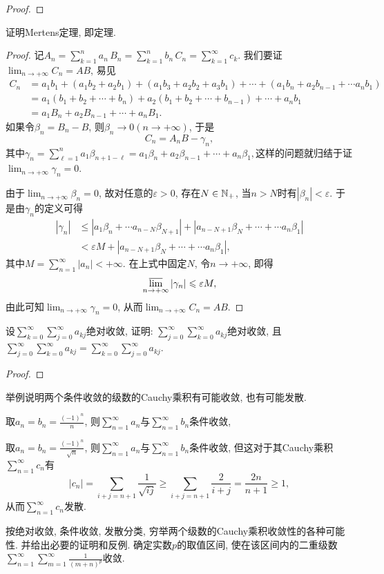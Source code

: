 \begin{quiza}
\begin{proof}
\end{proof}
\woe 证明Mertens定理, 即定理.
\begin{proof}
记\(A_n=\sum_{k=1}^{n}a_n\,B_n=\sum_{k=1}^{n}b_n\,C_n=\sum_{k=1}^{\infty}c_k\). 我们要证\(\lim_{n\rightarrow+\infty}C_n=AB\), 易见\[\begin{split}
C_n&=a_1b_1+(a_1b_2+a_2b_1)+(a_1b_3+a_2b_2+a_3b_1)+\cdots+\left(a_1b_n+a_2b_{n-1}+\cdots a_nb_1\right)\\&=a_1\left(b_1+b_2+\cdots+b_n\right)+a_2(b_1+b_2+\cdots+b_{n-1})+\cdots+a_nb_1\\&=a_1B_n+a_2B_{n-1}+\cdots+a_nB_1.
\end{split}\]如果令\(\beta_n=B_n-B\), 则\(\beta_n\rightarrow 0(n\rightarrow+\infty)\), 于是\[C_n=A_nB-\gamma_n,\]其中\(\gamma_n=\sum_{\ell=1}^{n}a_1\beta_{n+1-\ell}=a_1\beta_n+a_2\beta_{n-1}+\cdots+a_n\beta_1,\)这样的问题就归结于证\(\lim_{n\rightarrow+\infty}\gamma_n=0\).

由于\(\lim_{n\rightarrow+\infty}\beta_n=0\), 故对任意的\(\varepsilon>0\), 存在\(N\in\mathbb{N}_+\), 当\(n>N\)时有\(|\beta_n|<\varepsilon\). 于是由\(\gamma_n\)的定义可得\[\begin{split}
|\gamma_n|&\leqslant\left|a_1\beta_n+\cdots a_{n-N}\beta_{N+1}\right|+\left|a_{n-N+1}\beta_{N}+\cdots+\cdots a_n\beta_1\right|\\&<\varepsilon M+\left|a_{n-N+1}\beta_{N}+\cdots+\cdots a_n\beta_1\right|,
\end{split}\]其中\(M=\sum_{n=1}^{\infty}|a_n|<+\infty\). 在上式中固定\(N\), 令\(n\rightarrow+\infty\), 即得\[\varlimsup_{n\rightarrow+\infty}|\gamma_n|\leqslant\varepsilon M,\]由此可知\(\lim_{n\rightarrow+\infty}\gamma_n=0\), 从而\(\lim_{n\rightarrow+\infty}C_n=AB.\)
\end{proof}
\woe 设\(\sum_{k=0}^{\infty}\sum_{j=0}^{\infty}a_{kj}\)绝对收敛, 证明: \(\sum_{j=0}^{\infty}\sum_{k=0}^{\infty}a_{kj}\)绝对收敛, 且\(\sum_{j=0}^{\infty}\sum_{k=0}^{\infty}a_{kj}=\sum_{k=0}^{\infty}\sum_{j=0}^{\infty}a_{kj}\).
\begin{proof}

\end{proof}
\woe 举例说明两个条件收敛的级数的Cauchy乘积有可能收敛, 也有可能发散.
\begin{solution}
取\(a_n=b_n=\frac{(-1)^n}{n}\), 则\(\sum_{n=1}^{\infty}a_n\)与\(\sum_{n=1}^{\infty}b_n\)条件收敛,

取\(a_n=b_n=\frac{(-1)^n}{\sqrt{n}}\), 则\(\sum_{n=1}^{\infty}a_n\)与\(\sum_{n=1}^{\infty}b_n\)条件收敛, 但这对于其Cauchy乘积\(\sum_{n=1}^{\infty}c_n\)有\[|c_n|=\sum_{i+j=n+1}\frac{1}{\sqrt{ij}}\geqslant\sum_{i+j=n+1}\frac{2}{i+j}=\frac{2n}{n+1}\geqslant 1,\]从而\(\sum_{n=1}^{\infty}c_n\)发散.
\end{solution}
\woe 按绝对收敛, 条件收敛, 发散分类, 穷举两个级数的Cauchy乘积收敛性的各种可能性. 并给出必要的证明和反例.
\woe 确定实数\(p\)的取值区间, 使在该区间内的二重级数\(\sum_{n=1}^{\infty}\sum_{m=1}^{\infty}\frac{1}{(m+n)^p}\)收敛.
\begin{solution}


\end{solution}
\end{quiza}
